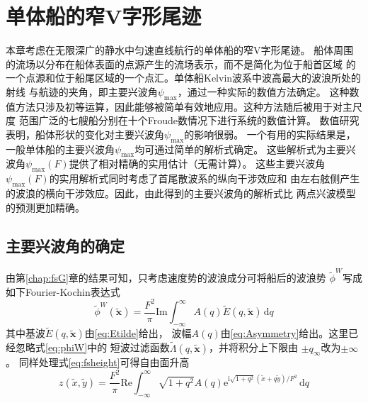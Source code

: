 \chapter{单体船的窄V字形尾迹}
\label{chap:monohull}

本章考虑在无限深广的静水中匀速直线航行的单体船的窄V字形尾迹。
船体周围的流场以分布在船体表面的点源产生的流场表示，而不是简化为位于船首区域
的一个点源和位于船尾区域的一个点汇。单体船Kelvin波系中波高最大的波浪所处的射线
与航迹的夹角，即主要兴波角$\psi_{\max}$，通过一种实际的数值方法确定。
这种数值方法只涉及初等运算，因此能够被简单有效地应用。这种方法随后被用于对主尺度
范围广泛的七艘船分别在十个Froude数情况下进行系统的数值计算。
数值研究表明，船体形状的变化对主要兴波角$\psi_{\max}$的影响很弱。
一个有用的实际结果是，一般单体船的主要兴波角$\psi_{\max}$均可通过简单的解析式确定。
这些解析式为主要兴波角$\psi_{\max}(F)$提供了相对精确的实用估计（无需计算）。
这些主要兴波角$\psi_{\max}(F)$的实用解析式同时考虑了首尾散波系的纵向干涉效应和
由左右舷侧产生的波浪的横向干涉效应。因此，由此得到的主要兴波角的解析式比
两点兴波模型\supercite{Noblesse2014Why}的预测更加精确。

\section{主要兴波角的确定}
\label{sec:psimaxcalc}

由第\ref{chap:fsG}章的结果可知，只考虑速度势的波浪成分可将船后的波浪势
$\tilde{\phi}^W$写成如下Fourier-Kochin表达式
\begin{equation}
  \tilde{\phi}^W(\tilde{\mathbf{x}})=\frac{F^2}{\pi}\mathrm{Im}
  \int_{-\infty}^{\infty}
  A(q)\tilde{E}(q,\tilde{\mathbf{x}})\,\mathrm{d}q
  \label{eq:fkrepresent}
\end{equation}
其中基波$\tilde{E}(q,\tilde{\mathbf{x}})$由\eqref{eq:Etilde}给出，
波幅$A(q)$由\eqref{eq:Asymmetry}给出。这里已经忽略式\eqref{eq:phiW}中的
短波过滤函数$\tilde{\Lambda}(q,\tilde{\mathbf{x}})$，并将积分上下限由
$\pm q_{\infty}$改为$\pm\infty$。
同样处理式\eqref{eq:fsheight}可得自由面升高
\begin{equation}
  z(\tilde{x},\tilde{y})=\frac{F^2}{\pi}\mathrm{Re}\int_{-\infty}^{\infty}
  \sqrt{1+q^2}A(q)\mathrm{e}^{\mathrm{i}\sqrt{1+q^2}(\tilde{x}+q\tilde{y})/F^2}
  \,\mathrm{d}q
  \label{eq:freesurfelev}
\end{equation}

